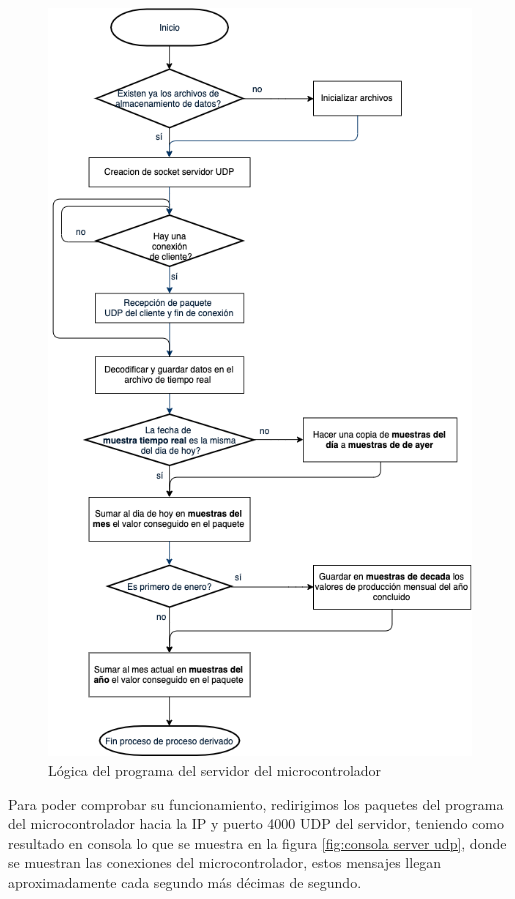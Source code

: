 \begin{figure}[H]
	\centering
	\includegraphics[scale=.5]{Capitulo5/images/logica_server_udp.png}
	\caption{Lógica del programa del servidor del microcontrolador}
	\label{fig:programa del servidor microcontrolador}
\end{figure} 

Para poder comprobar su funcionamiento, redirigimos los paquetes del programa del microcontrolador hacia la IP y puerto 4000 UDP del servidor, teniendo como resultado en consola lo que se muestra en la figura \ref{fig:consola server udp}, donde se muestran las conexiones del microcontrolador, estos mensajes llegan aproximadamente cada segundo más décimas de segundo.

